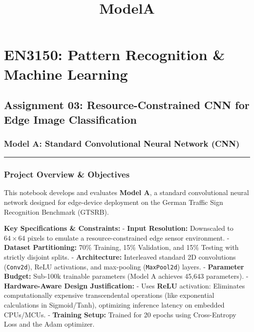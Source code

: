 \documentclass[11pt]{article}
\title{ModelA}
\begin{document}
    
    \maketitle
    
    

    
    \section{EN3150: Pattern Recognition \& Machine
Learning}\label{en3150-pattern-recognition-machine-learning}

\subsection{Assignment 03: Resource-Constrained CNN for Edge Image
Classification}\label{assignment-03-resource-constrained-cnn-for-edge-image-classification}

\subsubsection{Model A: Standard Convolutional Neural Network
(CNN)}\label{model-a-standard-convolutional-neural-network-cnn}

\begin{center}\rule{0.5\linewidth}{0.5pt}\end{center}

\subsubsection{Project Overview \&
Objectives}\label{project-overview-objectives}

This notebook develops and evaluates \textbf{Model A}, a standard
convolutional neural network designed for edge-device deployment on the
German Traffic Sign Recognition Benchmark (GTSRB).

\textbf{Key Specifications \& Constraints:} - \textbf{Input Resolution:}
Downscaled to \(64 \times 64\) pixels to emulate a resource-constrained
edge sensor environment. - \textbf{Dataset Partitioning:} 70\% Training,
15\% Validation, and 15\% Testing with strictly disjoint splits. -
\textbf{Architecture:} Interleaved standard 2D convolutions
(\texttt{Conv2d}), ReLU activations, and max-pooling
(\texttt{MaxPool2d}) layers. - \textbf{Parameter Budget:} Sub-100k
trainable parameters (Model A achieves 45,643 parameters). -
\textbf{Hardware-Aware Design Justification:} - Uses \textbf{ReLU}
activation: Eliminates computationally expensive transcendental
operations (like exponential calculations in Sigmoid/Tanh), optimizing
inference latency on embedded CPUs/MCUs. - \textbf{Training Setup:}
Trained for 20 epochs using Cross-Entropy Loss and the Adam optimizer.
\end{document}
